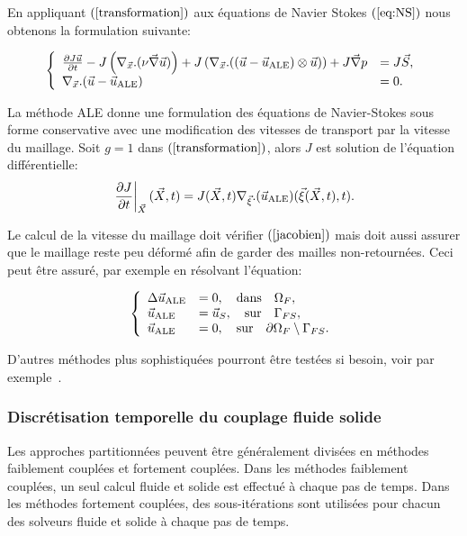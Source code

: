 En appliquant $(\ref{transformation})$ aux \'equations de Navier Stokes $(\ref{eq:NS})$ nous obtenons la formulation suivante:


\begin{equation}
\left\{
\begin{array}{ll}
\frac{\partial J \velocity}{\partial t} - J \left( \nabla_{\vec{x}}. (\nu \vect{\nabla} \velocity) \right)  + J \left( \nabla_{\vec{x}}. ( (\velocity - \vale) \otimes \velocity ) \right)  + J\vect{\nabla}p & =J\vect{S}, \\
\nabla_{\vec{x}}. ( \velocity - \vale )&=0.
\end{array}
\right.
\label{eq:NS_ALE}
\end{equation}

La m\'ethode ALE donne une formulation des \'equations de Navier-Stokes sous forme conservative avec une modification des vitesses de transport par la vitesse du maillage. 
Soit $g =  1$ dans  $(\ref{transformation})$, alors $J$ est solution de l'\'equation diff\'erentielle:
\begin{equation}
\left.\frac{\partial J}{\partial t}\right|_{\vec{X}}  (\vec{X},t) = J (\vec{X},t) \nabla_{\vec{\xi}}.(\vale)(\vec{\xi} (\vec{X},t), t ).
\label{jacobien}
\end{equation}

Le calcul de la vitesse du maillage doit v\'erifier  $(\ref{jacobien})$ mais doit aussi assurer que le maillage reste peu d\'eform\'e afin de garder des mailles non-retourn\'ees. Ceci peut \^etre assur\'e, par exemple en r\'esolvant l'\'equation:

\begin{equation}
\label{laplacien}
  \left\{
\begin{array}{ll}
\Delta \vale &= 0, \quad \text{dans}\quad \Omega_F, \\
\vale &= \velocity_S, \quad \text{sur}\quad \Gamma_{FS}, \\
\vale &= 0, \quad \text{sur} \quad \partial \Omega_F \setminus \Gamma_{FS}.
\end{array}
\right.
\end{equation}

D'autres m\'ethodes plus sophistiqu\'ees pourront \^etre test\'ees si besoin, voir par exemple~\cite{Bastinga}.

\subsubsection[Discr\'etisation temporelle]{Discr\'etisation temporelle du couplage fluide solide}
Les approches partitionn\'ees peuvent \^etre g\'en\'eralement divis\'ees en m\'ethodes faiblement coupl\'ees et fortement coupl\'ees. Dans les m\'ethodes faiblement coupl\'ees, un seul calcul
fluide et solide est effectu\'e \`a chaque pas de temps. Dans les m\'ethodes fortement coupl\'ees,
des sous-it\'erations sont utilis\'ees pour chacun des solveurs fluide et solide \`a chaque pas de temps.

